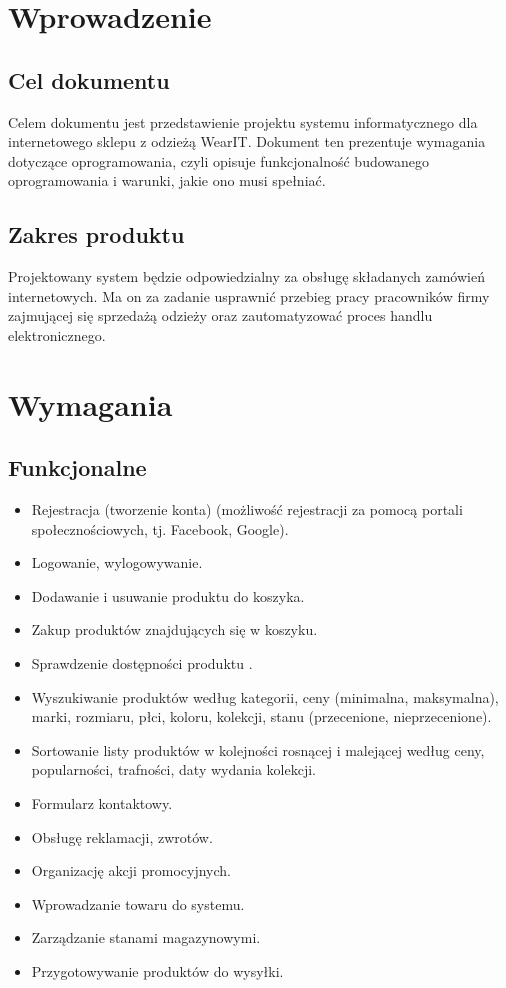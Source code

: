 \documentclass[a4paper,11pt]{article}
\begin{document}
\section {Wprowadzenie}

\subsection {Cel dokumentu}
Celem dokumentu jest przedstawienie projektu systemu informatycznego dla internetowego sklepu z odzieżą WearIT. Dokument ten prezentuje wymagania dotyczące oprogramowania, czyli opisuje funkcjonalność budowanego oprogramowania i warunki, jakie ono musi spełniać. 

\subsection {Zakres produktu}
Projektowany system będzie odpowiedzialny za obsługę składanych zamówień internetowych. Ma on za zadanie usprawnić przebieg pracy pracowników firmy zajmującej się sprzedażą odzieży oraz zautomatyzować proces handlu elektronicznego.


\section {Wymagania}

\subsection {Funkcjonalne}
\begin{itemize}
	\item Rejestracja (tworzenie konta) (możliwość rejestracji za pomocą portali społecznościowych, tj. Facebook, Google).
	\item Logowanie, wylogowywanie.
	\item Dodawanie i usuwanie produktu do koszyka.
	\item Zakup produktów znajdujących się w koszyku.
	\item Sprawdzenie dostępności produktu .
	\item Wyszukiwanie produktów według kategorii, ceny (minimalna, maksymalna), marki, rozmiaru, płci, koloru, kolekcji, stanu (przecenione, nieprzecenione).
	\item Sortowanie listy produktów w kolejności rosnącej i malejącej według ceny, popularności, trafności, daty wydania kolekcji.
	\item Formularz kontaktowy.
	\item Obsługę reklamacji, zwrotów.
	\item Organizację akcji promocyjnych.
	\item Wprowadzanie towaru do systemu.
	\item Zarządzanie stanami magazynowymi.
	\item Przygotowywanie produktów do wysyłki.
\end{itemize} 
\end{document}
